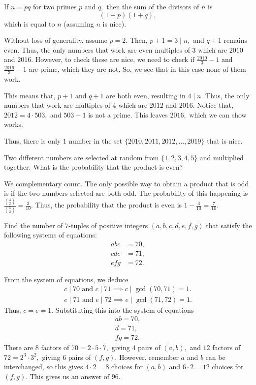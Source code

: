 \documentclass[11pt,paper=letter]{scrartcl}
\begin{document}
If $n = pq$ for two primes $p$ and $q,$ then the sum of the divisors of $n$ is \[(1 + p)(1 + q),\] which is equal to $n$ (assuming $n$ is nice).

 Without loss of generality, assume $p = 2.$ Then, $p + 1 = 3 \mid n,$ and $q + 1$ remains even. Thus, the only numbers that work are even multiples of $3$ which are $2010$ and $2016.$ However, to check these are nice, we need to check if $\frac{2010}{3} - 1$ and $\frac{2016}{3} - 1$ are prime, which they are not. So, we see that in this case none of them work.

 This means that, $p + 1$ and $q + 1$ are both even, resulting in $4 \mid n.$ Thus, the only numbers that work are multiples of $4$ which are $2012$ and $2016.$ Notice that, $2012 = 4 \cdot 503,$ and $503 - 1$ is not a prime. This leaves $2016,$ which we can show works.

Thus, there is only $\boxed{1}$ number in the set $\{2010, 2011, 2012,\ldots,2019\}$ that is nice.

\begin{exboxed}[AMC 10B 2016/12]
Two different numbers are selected at random from $\{1, 2, 3, 4, 5\}$ and multiplied together. What is the probability that the product is even?
\end{exboxed}
We complementary count. The only possible way to obtain a product that is odd is if the two numbers selected are both odd. The probability of this happening is $\frac{\binom{3}{2}}{\binom{5}{2}} = \frac{3}{10}.$ Thus, the probability that the product is even is $1 - \frac{3}{10} = \frac{7}{10}.$

\begin{exboxed}[AIME II 2019/3]
Find the number of $7$-tuples of positive integers $(a,b,c,d,e,f,g)$ that satisfy the following systems of equations:
\begin{align*}
abc&=70,\\
cde&=71,\\
efg&=72.
\end{align*}
\end{exboxed}
From the system of equations, we deduce 
\begin{align*}
    c \mid 70 \text{ and } c \mid 71 \implies c \mid \gcd(70, 71) = 1.\\
    e \mid 71 \text{ and } e \mid 72 \implies e \mid \gcd(71, 72) = 1.
\end{align*}
Thus, $c = e = 1.$ Substituting this into the system of equations 
\begin{align*}
    ab = 70,\\
    d = 71,\\
    fg = 72.
\end{align*}
There are $8$ factors of $70 = 2 \cdot 5 \cdot 7,$ giving $4$ pairs of $(a, b),$ and $12$ factors of $72 = 2^3 \cdot 3^2,$ giving $6$ pairs of $(f, g).$ However, remember $a$ and $b$ can be interchanged, so this gives $4 \cdot 2 = 8$ choices for $(a, b)$ and $6 \cdot 2 = 12$ choices for $(f, g).$ This gives us an answer of $\boxed{96}.$
\end{document}
